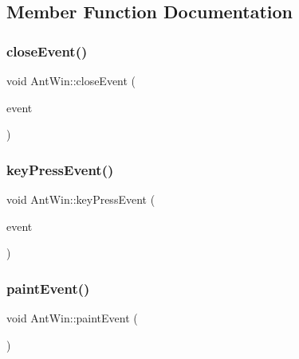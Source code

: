 \subsection{Member Function Documentation}
\mbox{\label{classAntWin_a013de5573b35b0a9ba2f7b3fd314c25c}} 
\subsubsection{\texorpdfstring{close\+Event()}{closeEvent()}}
{\footnotesize\ttfamily void Ant\+Win\+::close\+Event (\begin{DoxyParamCaption}\item[{Q\+Close\+Event $\ast$}]{event }\end{DoxyParamCaption})\hspace{0.3cm}{\ttfamily [inline]}}

\mbox{\label{classAntWin_a0a8300f161559f14a3fd9d646fed1478}} 
\subsubsection{\texorpdfstring{key\+Press\+Event()}{keyPressEvent()}}
{\footnotesize\ttfamily void Ant\+Win\+::key\+Press\+Event (\begin{DoxyParamCaption}\item[{Q\+Key\+Event $\ast$}]{event }\end{DoxyParamCaption})\hspace{0.3cm}{\ttfamily [inline]}}

\mbox{\label{classAntWin_aa2f05b53e7e105c1e3985298666b5eb8}} 
\subsubsection{\texorpdfstring{paint\+Event()}{paintEvent()}}
{\footnotesize\ttfamily void Ant\+Win\+::paint\+Event (\begin{DoxyParamCaption}\item[{Q\+Paint\+Event $\ast$}]{ }\end{DoxyParamCaption})}

